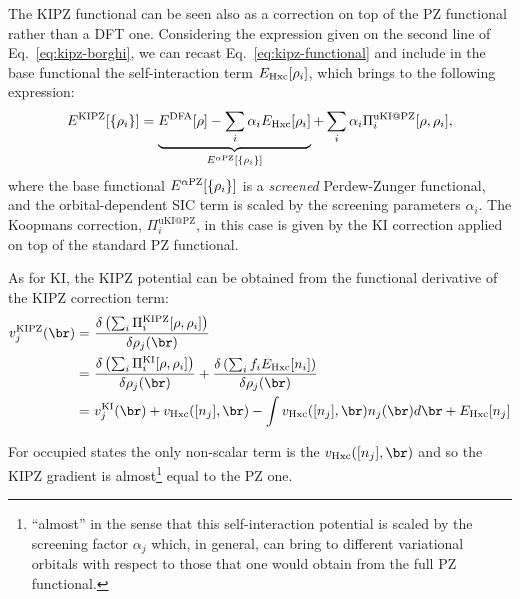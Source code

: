 The KIPZ functional can be seen also as a correction on top of the PZ functional rather than a DFT one. Considering the expression given on the second line of Eq.~\eqref{eq:kipz-borghi}, we can recast Eq.~\eqref{eq:kipz-functional} and include in the base functional the self-interaction term $E_{\rm Hxc}[\rho_i]$, which brings to the following expression:
%
\begin{equation}
    E^{\rm KIPZ}[\{\rho_i\}] = \underbrace{E^{\rm DFA}[\rho] - \sum_i \alpha_i E_{\rm Hxc}[\rho_i]}_{E^{\alpha\rm PZ}[\{\rho_i\}]} + \sum_i {\alpha_i} \Pi^{\text{uKI@PZ}}_i[\rho,\rho_i] ,
    \label{eq:kipz-as-ki-on-pz}
\end{equation}
%
where the base functional $E^{\alpha\rm PZ}[\{\rho_i\}]$ is a \emph{screened} Perdew-Zunger functional, and the orbital-dependent SIC term is scaled by the screening parameters $\alpha_i$. The Koopmans correction, $\Pi^{\text{uKI@PZ}}_i$, in this case is given by the KI correction applied on top of the standard PZ functional.

As for KI, the KIPZ potential can be obtained from the functional derivative of the KIPZ correction term:
%
\begin{equation}
    \begin{split}
        v^{\rm KIPZ}_j(\br) =\ &\frac{\delta \left( \sum_i \Pi^{\rm KIPZ}_i[\rho,\rho_i] \right)}{\delta \rho_j(\br)} \\
        =\ &\frac{\delta \left( \sum_i \Pi^{\text{KI}}_i[\rho,\rho_i] \right)}{\delta \rho_j(\br)} + 
        \frac{\delta \left( \sum_i f_i E_{\rm Hxc}[n_i] \right)}{\delta \rho_j(\br)} \\
        =\ &v^{\text{KI}}_j(\br) + v_{\rm Hxc}([n_j],\br) - \int v_{\rm Hxc}([n_j],\br) n_j(\br) d\br + E_{\rm Hxc}[n_j]
    \end{split}
    \label{eq:kipz-pot-full}
\end{equation}

For occupied states the only non-scalar term is the $v_{\rm Hxc}([n_j],\br)$ and so the KIPZ gradient is almost\footnote{``almost'' in the sense that this self-interaction potential is scaled by the screening factor $\alpha_j$ which, in general, can bring to different variational orbitals with respect to those that one would obtain from the full PZ functional.} equal to the PZ one.